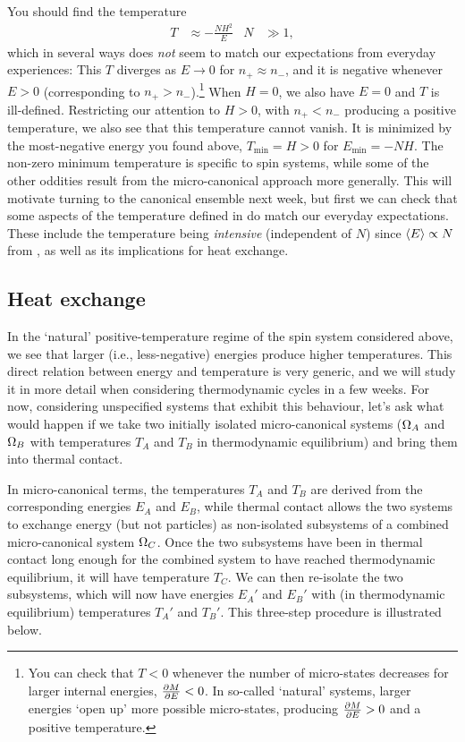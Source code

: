 You should find the temperature
\begin{align}
  T & \approx -\frac{NH^2}{E} &
  N & \gg 1,
\end{align}
which in several ways does \textit{not} seem to match our expectations from everyday experiences: This $T$ diverges as $E \to 0$ for $n_+ \approx n_-$, and it is negative whenever $E > 0$ (corresponding to $n_+ > n_-$).\footnote{You can check that $T < 0$ whenever the number of micro-states decreases for larger internal energies, $\frac{\partial M}{\partial E} < 0$.  In so-called `natural' systems, larger energies `open up' more possible micro-states, producing $\frac{\partial M}{\partial E} > 0$ and a positive temperature.}
When $H = 0$, we also have $E = 0$ and $T$ is ill-defined.
Restricting our attention to $H > 0$, with $n_+ < n_-$ producing a positive temperature, we also see that this temperature cannot vanish.
It is minimized by the most-negative energy you found above, $T_{\text{min}} = H > 0$ for $E_{\text{min}} = -NH$.
The non-zero minimum temperature is specific to spin systems, while some of the other oddities result from the micro-canonical approach more generally.
This will motivate turning to the canonical ensemble next week, but first we can check that some aspects of the temperature defined in  do match our everyday expectations.
These include the temperature being \textit{intensive} (independent of $N$) since $\left\langle E \right\rangle \propto N$ from , as well as its implications for heat exchange.



\subsection{\label{sec:heat_ex}Heat exchange}
In the `natural' positive-temperature regime of the spin system considered above, we see that larger (i.e., less-negative) energies produce higher temperatures.
This direct relation between energy and temperature is very generic, and we will study it in more detail when considering thermodynamic cycles in a few weeks.
For now, considering unspecified systems that exhibit this behaviour, let's ask what would happen if we take two initially isolated micro-canonical systems ($\Omega_A$ and $\Omega_B$ with temperatures $T_A$ and $T_B$ in thermodynamic equilibrium) and bring them into thermal contact.

In micro-canonical terms, the temperatures $T_A$ and $T_B$ are derived from the corresponding energies $E_A$ and $E_B$, while thermal contact allows the two systems to exchange energy (but not particles) as non-isolated subsystems of a combined micro-canonical system $\Omega_C$.
Once the two subsystems have been in thermal contact long enough for the combined system to have reached thermodynamic equilibrium, it will have temperature $T_C$.
We can then re-isolate the two subsystems, which will now have energies $E_A'$ and $E_B'$ with (in thermodynamic equilibrium) temperatures $T_A'$ and $T_B'$.
This three-step procedure is illustrated below.


